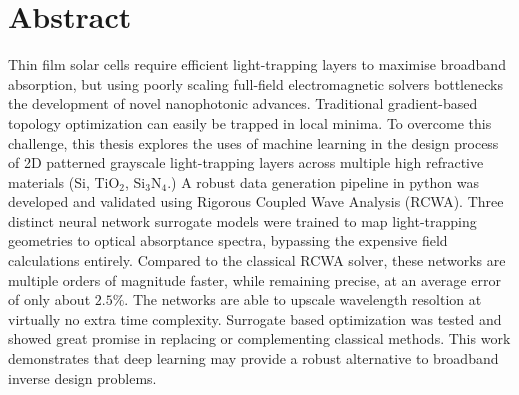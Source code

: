 \chapter*{Abstract}

Thin film solar cells require efficient light-trapping layers to maximise broadband absorption, but using poorly scaling full-field
electromagnetic solvers bottlenecks the development of novel nanophotonic advances. Traditional gradient-based topology optimization
can easily be trapped in local minima. To overcome this challenge, this thesis explores the uses of machine learning in the design
process of 2D patterned grayscale light-trapping layers across multiple high refractive materials (Si, TiO$_2$, Si$_3$N$_4$.) A robust data generation pipeline
in python was developed and validated using Rigorous Coupled Wave Analysis (RCWA). Three distinct neural network surrogate models
were trained to map light-trapping geometries to optical absorptance spectra, bypassing the expensive field calculations entirely. Compared to the classical RCWA solver,
these networks are multiple orders of magnitude faster, while remaining precise, at an average error of only about $2.5\%$. The networks are able to upscale wavelength resoltion at virtually no extra time complexity.
Surrogate based optimization was tested and showed great promise in replacing or complementing classical methods. This work demonstrates that deep learning may provide a robust alternative to broadband inverse design problems.